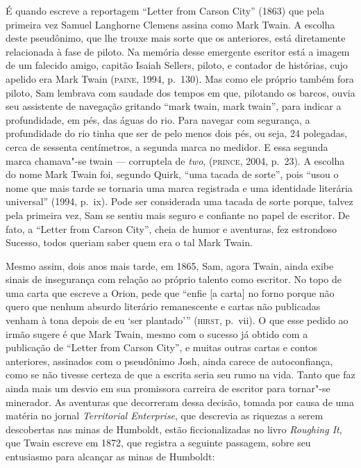 É quando escreve a reportagem “Letter from Carson City” (1863) que pela
primeira vez Samuel Langhorne Clemens assina como Mark Twain. A escolha
deste pseudônimo, que lhe trouxe mais sorte que os anteriores,
está diretamente relacionada à fase de piloto. Na memória desse emergente
escritor está a imagem de um falecido amigo, capitão Isaiah Sellers,
piloto, e contador de histórias, cujo apelido era Mark Twain (\textsc{paine}, 1994,
p.~130). Mas como ele próprio também fora piloto, Sam lembrava com
saudade dos tempos em que, pilotando os barcos, ouvia seu
assistente de navegação gritando ``mark twain, mark
twain'', para indicar a profundidade, em pés, das águas do
rio. Para navegar com segurança, a profundidade do rio tinha que ser de
pelo menos dois pés, ou seja, 24 polegadas, cerca de sessenta centímetros, a segunda marca no
medidor. E essa segunda marca chamava"-se twain --- corruptela de \textit{two},
(\textsc{prince}, 2004, p.~23). A escolha do nome Mark Twain foi, segundo Quirk,
“uma tacada de sorte”, pois “usou o nome que mais tarde se tornaria uma
marca registrada e uma identidade literária universal” (1994, p.~ix). Pode
ser considerada uma tacada de sorte porque, talvez pela primeira vez, Sam
se sentiu mais seguro e confiante no papel de escritor. De fato, a
“Letter from Carson City”, cheia de humor e aventuras, fez estrondoso
Sucesso, todos queriam saber quem era o tal Mark Twain.

Mesmo assim, dois anos mais tarde, em 1865, Sam, agora Twain, ainda
exibe sinais de insegurança com relação ao próprio talento como
escritor. No topo de uma carta que escreve a Orion, pede que “enfie [a
carta] no forno porque não quero que nenhum absurdo literário remanescente
e cartas não publicadas venham à tona depois de eu ‘ser plantado’” (\textsc{hirst}, p.~vii).
O que esse pedido ao irmão sugere é que Mark Twain, mesmo com o
sucesso já obtido com a publicação de “Letter from Carson City”, e muitas
outras cartas e contos anteriores, assinados com o pseudônimo Josh, ainda
carece de autoconfiança, como se não tivesse certeza de que a escrita
seria seu rumo na vida. Tanto que faz ainda mais um desvio em
sua promissora carreira de escritor para tornar"-se minerador. As aventuras
que decorreram dessa decisão, tomada por causa de uma matéria no jornal
\textit{Territorial Enterprise}, que descrevia as riquezas a serem descobertas nas
minas de Humboldt, estão ficcionalizadas no livro \textit{Roughing It}, que
Twain escreve em 1872, que registra a seguinte passagem, sobre seu entusiasmo para
alcançar as minas de Humboldt: 

